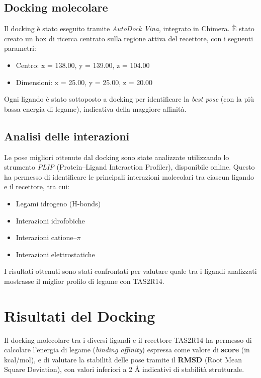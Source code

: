 \documentclass[12pt, a4paper]{book}
\begin{document}
\section*{Docking molecolare}
Il docking è stato eseguito tramite \textit{AutoDock Vina}, integrato in Chimera. È stato creato un box di ricerca centrato sulla regione attiva del recettore, con i seguenti parametri:
\begin{itemize}
    \item Centro: x = 138.00, y = 139.00, z = 104.00
    \item Dimensioni: x = 25.00, y = 25.00, z = 20.00
\end{itemize}

Ogni ligando è stato sottoposto a docking per identificare la \textit{best pose} (con la più bassa energia di legame), indicativa della maggiore affinità.

\section*{Analisi delle interazioni}
Le pose migliori ottenute dal docking sono state analizzate utilizzando lo strumento \textit{PLIP} (Protein–Ligand Interaction Profiler), disponibile online. Questo ha permesso di identificare le principali interazioni molecolari tra ciascun ligando e il recettore, tra cui:
\begin{itemize}
    \item Legami idrogeno (H-bonds)
    \item Interazioni idrofobiche
    \item Interazioni catione–$\pi$
    \item Interazioni elettrostatiche
\end{itemize}

I risultati ottenuti sono stati confrontati per valutare quale tra i ligandi analizzati mostrasse il miglior profilo di legame con TAS2R14.
\newpage
\chapter{Risultati del Docking}

Il docking molecolare tra i diversi ligandi e il recettore TAS2R14 ha permesso di calcolare l’energia di legame (\textit{binding affinity}) espressa come valore di \textbf{score} (in kcal/mol), e di valutare la stabilità delle pose tramite il \textbf{RMSD} (Root Mean Square Deviation), con valori inferiori a 2 Å indicativi di stabilità strutturale.
\end{document}
